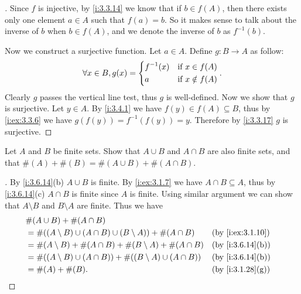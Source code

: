 \begin{proof}[]
  Since \(f\) is injective, by \cref{i:3.3.14} we know that if \(b \in f(A)\), then there exists only one element \(a \in A\) such that \(f(a) = b\).
  So it makes sense to talk about the inverse of \(b\) when \(b \in f(A)\), and we denote the inverse of \(b\) as \(f^{-1}(b)\).

  Now we construct a surjective function.
  Let \(a \in A\).
  Define \(g : B \to A\) as follow:
  \[
    \forall x \in B, g(x) = \begin{dcases}
      f^{-1}(x) & \text{if } x \in f(A)    \\
      a         & \text{if } x \notin f(A)
    \end{dcases}.
  \]
  Clearly \(g\) passes the vertical line test, thus \(g\) is well-defined.
  Now we show that \(g\) is surjective.
  Let \(y \in A\).
  By \cref{i:3.4.1} we have \(f(y) \in f(A) \subseteq B\), thus by \cref{i:ex:3.3.6} we have \(g(f(y)) = f^{-1}(f(y)) = y\).
  Therefore by \cref{i:3.3.17} \(g\) is surjective.
\end{proof}

\begin{ex}\label{i:ex:3.6.9}
  Let \(A\) and \(B\) be finite sets.
  Show that \(A \cup B\) and \(A \cap B\) are also finite sets, and that \(\#(A) + \#(B) = \#(A \cup B) + \#(A \cap B)\).
\end{ex}

\begin{proof}[]
  By \cref{i:3.6.14}(b) \(A \cup B\) is finite.
  By \cref{i:ex:3.1.7} we have \(A \cap B \subseteq A\), thus by \cref{i:3.6.14}(c) \(A \cap B\) is finite since \(A\) is finite.
  Using similar argument we can show that \(A \setminus B\) and \(B \setminus A\) are finite.
  Thus we have
  \begin{align*}
     & \#(A \cup B) + \#(A \cap B)                                                                       \\
     & = \#((A \setminus B) \cup (A \cap B) \cup (B \setminus A)) + \#(A \cap B)   &  & \by{i:ex:3.1.10} \\
     & = \#(A \setminus B) + \#(A \cap B) + \#(B \setminus A) + \#(A \cap B)       &  & \by{i:3.6.14}[b] \\
     & = \#((A \setminus B) \cup (A \cap B)) + \#((B \setminus A) \cup (A \cap B)) &  & \by{i:3.6.14}[b] \\
     & = \#(A) + \#(B).                                                            &  & \by{i:3.1.28}[g]
  \end{align*}
\end{proof}

